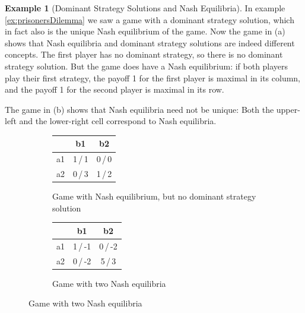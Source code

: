 \documentclass[a4paper]{scrreprt}
\theoremstyle{definition}
\newtheorem{ex}[thm]{Example} %
\begin{document}
    \begin{ex}[Dominant Strategy Solutions and Nash Equilibria]
        In example \ref{ex:prisonersDilemma} we saw a game with a dominant strategy solution, which in fact also is the unique Nash equilibrium of the game.
        Now the game in (a)
        shows that Nash equilibria and dominant strategy solutions are indeed different concepts. The first player has no dominant strategy, so there is no dominant strategy solution. But the game does have a Nash equilibrium: if both players play their first strategy, the payoff 1 for the first player is maximal in its column, and the payoff 1 for the second player is maximal in its row.
        
        The game in (b)
        shows that Nash equilibria need not be unique: Both the upper-left and the lower-right cell correspond to Nash equilibria.
        
        \begin{figure}[h]
            \centering
            \begin{subfigure}[t]{0.49\textwidth}
                \centering
                \begin{tabular}{c|c|c|}
                	   &   b1    &   b2    \\ \hline
                	a1 & 1\,/\,1 & 0\,/\,0 \\ \hline
                	a2 & 0\,/\,3 & 1\,/\,2 \\ \hline
                \end{tabular}
                \caption{Game with Nash equilibrium, but no dominant strategy solution}
                \label{fig:nashEquilibriumNoDominantStrategy}
            \end{subfigure}
            \begin{subfigure}[t]{0.49\textwidth}
                \centering
                \begin{tabular}{c|c|c|}
                    &   b1    &   b2    \\ \hline
                    a1 & 1\,/\,-1 & 0\,/\,-2 \\ \hline
                    a2 & 0\,/\,-2 & 5\,/\,3 \\ \hline
                \end{tabular}
                \caption{Game with two Nash equilibria}   
                \label{fig:twoNashEquilibria}
            \end{subfigure}
        \end{figure}
    \end{ex}
    
\end{document}

